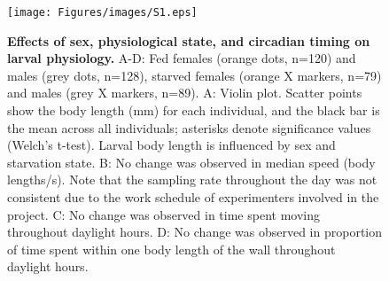 \begin{figure}[H]
  \texttt{[image: Figures/images/S1.eps]}
  \caption{\textbf{Effects of sex, physiological state, and circadian timing on larval physiology.} A-D: Fed females (orange dots, n=120) and males (grey dots, n=128), starved females (orange X markers, n=79) and males (grey X markers, n=89). A: Violin plot. Scatter points show the body length (mm) for each individual, and the black bar is the mean across all individuals; asterisks denote significance values (Welch's t-test). Larval body length is influenced by sex and starvation state. B: No change was observed in median speed (body lengths/s). Note that the sampling rate throughout the day was not consistent due to the work schedule of experimenters involved in the project. C: No change was observed in time spent moving throughout daylight hours. D: No change was observed in proportion of time spent within one body length of the wall throughout daylight hours.
}
\end{figure}

\null
\vfill